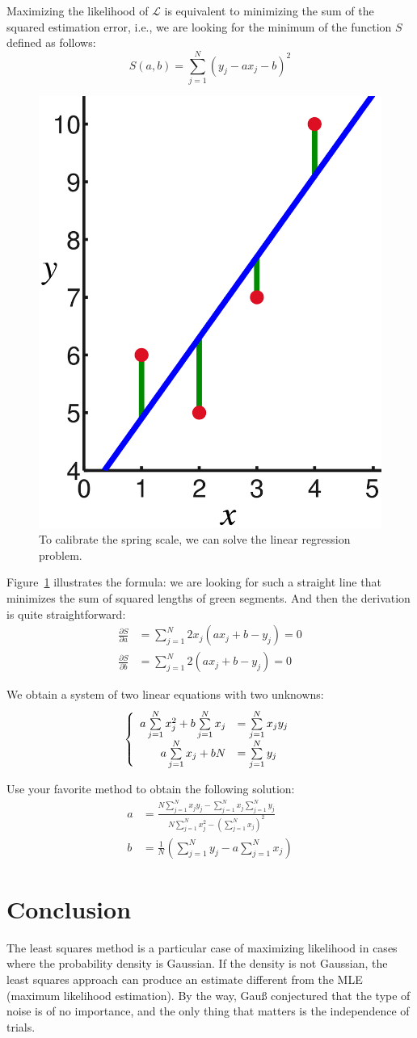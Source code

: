 \documentclass[notitlepage,oneside]{book}
\begin{document}
Maximizing the likelihood of $\mathcal L$ is equivalent to minimizing the sum of the squared estimation error, i.e., we are looking for the minimum of the function $S$ defined as follows:
$$
S(a, b) = \sum\limits_{j=1}^N (y_j- a x_j - b)^2
$$


\begin{figure}[htb!]
\centering
\includegraphics[width=.2\columnwidth]{img/c5aa80f6a2e9575abfa7b3dfdabf5c5a.png}
\caption{To calibrate the spring scale, we can solve the linear regression problem.}
\label{fig:regression}
\end{figure}

Figure~\ref{fig:regression} illustrates the formula: we are looking for such a straight line that minimizes the sum of squared lengths of green segments.
And then the derivation is quite straightforward:
\begin{align*}
\frac{\partial S}{\partial a} &= \sum\limits_{j=1}^N 2 x_j (a x_j + b - y_j) = 0 \\
\frac{\partial S}{\partial b} &= \sum\limits_{j=1}^N 2 (a x_j + b - y_j) = 0
\end{align*}

We obtain a system of two linear equations with two unknowns:
$$
\left \{ \begin{array}{r l}
a \sum\limits_{j=1}^N x_j^2 + b \sum\limits_{j=1}^N x_j  & = \sum\limits_{j=1}^N x_j y_j\\
a \sum\limits_{j=1}^N x_j   + b N                        & = \sum\limits_{j=1}^N y_j
\end{array} \right.
$$

Use your favorite method to obtain the following solution:
\begin{align*}
a &= \frac{N \sum\limits_{j=1}^N x_j y_j - \sum\limits_{j=1}^N x_j \sum\limits_{j=1}^N y_j}{N\sum\limits_{j=1}^N x_j^2 - \left(\sum\limits_{j=1}^N x_j\right)^2} \\
b &= \frac{1}{N}\left(  \sum\limits_{j=1}^N y_j - a  \sum\limits_{j=1}^N x_j \right)
\end{align*}

\section*{Conclusion}
The least squares method is a particular case of maximizing likelihood in cases where the probability density is Gaussian.
If the density is not Gaussian, the least squares approach can produce an estimate different from the MLE (maximum likelihood estimation).
By the way, Gauß conjectured that the type of noise is of no importance, and the only thing that matters is the independence of trials.
\end{document}
